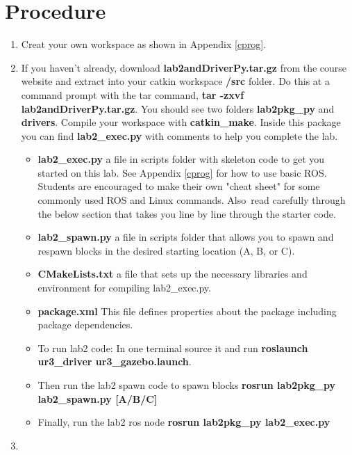 \section{Procedure}
\begin{enumerate}
\item Creat your own workspace as shown in Appendix \ref{cprog}.
\item If you haven't already, download \textbf{lab2andDriverPy.tar.gz} from the course website and extract into your catkin workspace \textbf{/src} folder.  Do this at
a command prompt with the tar command, \textbf{tar -zxvf lab2andDriverPy.tar.gz}.  You should see two folders \textbf{lab2pkg\_py} and \textbf{drivers}.  Compile your workspace with
\textbf{catkin\_make}. Inside this package you can find \textbf{lab2\_exec.py} with comments to help you complete the lab. 

\begin{itemize}
\item \textbf{lab2\_exec.py} a file in scripts folder with skeleton code to get you started on this lab. See Appendix \ref{cprog} for how to use basic ROS. Students are encouraged to make their own "cheat sheet" for some commonly used ROS and Linux commands. Also\
read carefully through the below section that takes you line by line through the starter code.  
\item \textbf{lab2\_spawn.py} a file in scripts folder that allows you to spawn and respawn blocks in the desired starting location (A, B, or C).
\item \textbf{CMakeLists.txt} a file that sets up the necessary libraries and environment for compiling lab2\_exec.py.
\item \textbf{package.xml} This file defines properties about the package including package dependencies.
\item To run lab2 code: In one terminal source it and run \textbf{roslaunch ur3\_driver ur3\_gazebo.launch}. 
\item Then run the lab2 spawn code to spawn blocks \textbf{rosrun lab2pkg\_py lab2\_spawn.py [A/B/C]}
\item Finally, run the lab2 ros node \textbf{rosrun lab2pkg\_py lab2\_exec.py}
\end{itemize}

\item 


\end{enumerate}
